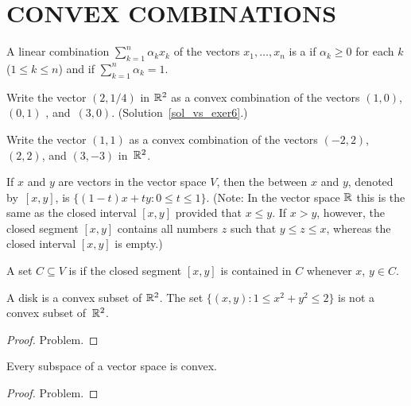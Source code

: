 \section{CONVEX COMBINATIONS}
\begin{defn} A linear combination $\sum_{k=1}^n\alpha_k x_k$ of the vectors $x_1, \dots, x_n$ is a
 if $\alpha_k \ge 0$ for each $k$ ($1 \le k \le n$) and if
$\sum_{k=1}^n \alpha_k = 1$.
\end{defn}

\begin{exer}\label{vs_exer6} Write the vector $(2,1/4)$ in $\mathbb{R}^2$ as a convex combination of the
vectors $(1,0)$, $(0,1)$ , and~$(3,0)$. (Solution~\ref{sol_vs_exer6}.)

\end{exer}

\begin{prob} Write the vector $(1,1)$ as a convex combination of the vectors $(-2,2)$, $(2,2)$,
and $(3,-3)$ in~$\mathbb{R}^2$.
\end{prob}

\begin{defn} If $x$ and $y$ are vectors in the vector space $V$, then the
 between $x$ and $y$, denoted
by~$[x,y]$, is $\{(1 - t)x + ty \colon 0 \le t \le 1\}$.  (Note: In the vector space $\mathbb{R}$ this
is the same as the closed interval $[x,y]$ provided that $x \le y$.  If $x > y$, however, the
closed segment $[x,y]$ contains all numbers $z$ such that $y \le z \le x$, whereas the closed
interval $[x,y]$ is empty.)

A set $C \subseteq V$ is
 if the closed segment $[x,y]$ is contained in $C$ whenever $x$, $y \in C$.
\end{defn}

\begin{exam} A disk is a convex subset of $\mathbb{R}^2$.  The set $\{(x,y) \colon 1 \le x^2 + y^2 \le 2\}$
is not a convex subset of~$\mathbb{R}^2$.
\end{exam}

\begin{proof} Problem.  \ns  \end{proof}

\begin{exam} Every subspace of a vector space is convex.
\end{exam}

\begin{proof} Problem.  \ns  \end{proof}

